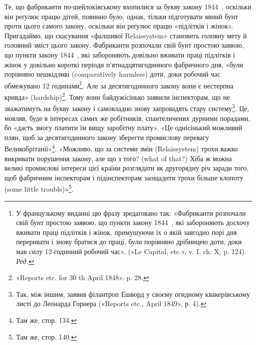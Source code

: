 Те, що фабриканти по-шейлоківському вхопилися за букву
закону 1844~, оскільки він реґулює працю дітей, повинно було,
однак, тільки підготувати явний бунт проти цього самого закону,
оскільки він реґулює працю «підлітків і жінок». Пригадаймо, що
скасування «фалшивої Relaissystem» становить головну мету
й головний зміст цього закону. Фабриканти розпочали свій бунт
простою заявою, що пункти закону 1844~, які забороняють довільно
вживати праці підлітків і жінок у довільно короткі
періоди п’ятнадцятигодинного фабричного дня, «були порівняно
нешкідливі (comparatively harmless) доти, доки робочий час
обмежувано 12 годинами\footnote*{
У французькому виданні цю фразу зредаґовано так: «Фабриканти
розпочали свій бунт простою заявою, що пункти закону 1844~, які забороняють
досхочу вживати праці підлітків і жінок, примушуючи їх о якій
завгодно порі дня переривати і знову братися до праці, були порівняно
дрібницею доти, доки мав силу 12-годинний робочий час». («Le Capital,
etc.», v. I, ch. X, p. 124). \emph{Ред.}
}. Але за десятигодинного закону вони
є нестерпна кривда» (hardship)\footnote{
«Reports etc. for 30 th April 1848». p. 28.
}. Тому вони байдужісінько
заявили інспекторам, що не зважатимуть на букву закону і
самовладно знову запровадять стару систему\footnote{
Так, між іншим, заявив філантроп Ешворд у своєму огидному
квакерівському листі до Леонарда Горнера («Reports etc., April 1849»,
р. 4).
}. Це, мовляв,
буде в інтересах самих же робітників, спантеличених дурними
порадами, бо «дасть змогу платити їм вищу заробітну плату».
«Це однісінький можливий плян, щоб за десятигодинного закону
зберегти промислову перевагу Великобрітанії»\footnote{
Там же, стор. 134.
}. «Можливо,
що за системи змін (Relaissystem) трохи важко викривати порушення
закону, але що з того? (what of that?) Хіба ж можна
великі промислові інтереси цієї країни розглядати як другорядну
річ заради того, щоб фабричним інспекторам і підінспекторам
заощадити трохи більше клопоту (some little trouble)»\footnote{
Там же, стор. 140.
}.
